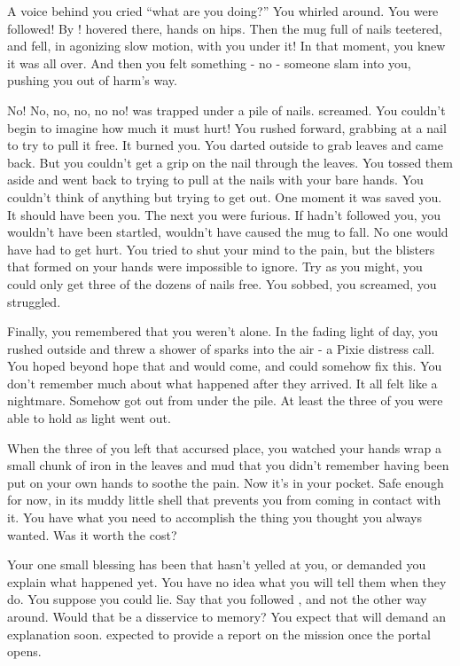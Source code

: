 \documentclass[char]{PP}
\begin{document}
A voice behind you cried “what are you doing?” You whirled around. You were followed! By \cFLost{}! \cFLost{\They} hovered there, hands on \cFLost{\their} hips. Then the mug full of nails teetered, and fell, in agonizing slow motion, with you under it! In that moment, you knew it was all over. And then you felt something - no - someone slam into you, pushing you out of harm's way.

No! No, no, no, no no! \cFLost{} was trapped under a pile of nails. \cFLost{\They} screamed. You couldn’t begin to imagine how much it must hurt! You rushed forward, grabbing at a nail to try to pull it free. It burned you. You darted outside to grab leaves and came back. But you couldn’t get a grip on the nail through the leaves. You tossed them aside and went back to trying to pull at the nails with your bare hands. You couldn’t think of anything but trying to get \cFLost{} out. One moment it was \cFLost{\They} saved you. It should have been you. The next you were furious. If \cFLost{} hadn’t followed you, you wouldn’t have been startled, wouldn’t have caused the mug to fall. No one would have had to get hurt. You tried to shut your mind to the pain, but the blisters that formed on your hands were impossible to ignore. Try as you might, you could only get three of the dozens of nails free. You sobbed, you screamed, you struggled. 

Finally, you remembered that you weren’t alone. In the fading light of day, you rushed outside and threw a shower of sparks into the air - a Pixie distress call. You hoped beyond hope that \cSPM{} and \cELove{} would come, and could somehow fix this. You don’t remember much about what happened after they arrived. It all felt like a nightmare. Somehow \cELove{} got \cFLost{} out from under the pile.  At least the three of you were able to hold \cFLost{} as \cFLost{\their} light went out.

When the three of you left that accursed place, you watched your hands wrap a small chunk of iron in the leaves and mud that you didn’t remember having been put on your own hands to soothe the pain. Now it’s in your pocket. Safe enough for now, in its muddy little shell that prevents you from coming in contact with it. You have what you need to accomplish the thing you thought you always wanted. Was it worth the cost?

Your one small blessing has been that \cSPM{} hasn’t yelled at you, or demanded you explain what happened yet. You have no idea what you will tell them when they do. You suppose you could lie. Say that you followed \cFLost{}, and not the other way around. Would that be a disservice to \cFLost{\their} memory? You expect that \cSPM{} will demand an explanation soon. \cSPM{\They} \cSPM{\are} expected to provide \cSHead{} a report on the mission once the portal opens.
\end{document}
